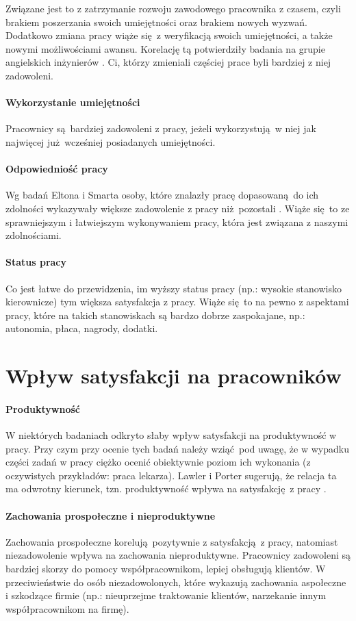Związane jest to z zatrzymanie rozwoju zawodowego pracownika z czasem, czyli brakiem poszerzania swoich umiejętności oraz brakiem nowych wyzwań. Dodatkowo zmiana pracy wiąże się z weryfikacją swoich umiejętności, a także nowymi możliwościami awansu. Korelację tą potwierdziły badania na grupie angielskich inżynierów \cite{newton1991further}. Ci, którzy zmieniali częściej prace byli bardziej z niej zadowoleni.
\paragraph{Wykorzystanie umiejętności} Pracownicy są bardziej zadowoleni z pracy, jeżeli wykorzystują w niej jak najwięcej już wcześniej posiadanych umiejętności.
\paragraph{Odpowiedniość pracy} Wg badań Eltona i Smarta osoby, które znalazły pracę dopasowaną do ich zdolności wykazywały większe zadowolenie z pracy niż pozostali \cite{elton1988extrinsic}. Wiąże się to ze sprawniejszym i łatwiejszym wykonywaniem pracy, która jest związana z naszymi zdolnościami.
\paragraph{Status pracy} Co jest łatwe do przewidzenia, im wyższy status pracy (np.: wysokie stanowisko kierownicze) tym większa satysfakcja z pracy. Wiąże się to na pewno z aspektami pracy, które na takich stanowiskach są bardzo dobrze zaspokajane, np.: autonomia, płaca, nagrody, dodatki.

\section{Wpływ satysfakcji na pracowników}
\label{sec:theory-sat-infl}
\paragraph{Produktywność} W niektórych badaniach odkryto słaby wpływ satysfakcji na produktywność w pracy. Przy czym przy ocenie tych badań należy wziąć pod uwagę, że w wypadku części zadań w pracy ciężko ocenić obiektywnie poziom ich wykonania (z oczywistych przykładów: praca lekarza). Lawler i Porter sugerują, że relacja ta ma odwrotny kierunek, tzn. produktywność wpływa na satysfakcję z pracy \cite{lawler1967effect}.
\paragraph{Zachowania prospołeczne i nieproduktywne} Zachowania prospołeczne korelują pozytywnie z satysfakcją z pracy, natomiast niezadowolenie wpływa na zachowania nieproduktywne. Pracownicy zadowoleni są bardziej skorzy do pomocy współpracownikom, lepiej obsługują klientów. W przeciwieństwie do osób niezadowolonych, które wykazują zachowania aspołeczne i szkodzące firmie (np.: nieuprzejme traktowanie klientów, narzekanie innym współpracownikom na firmę).
